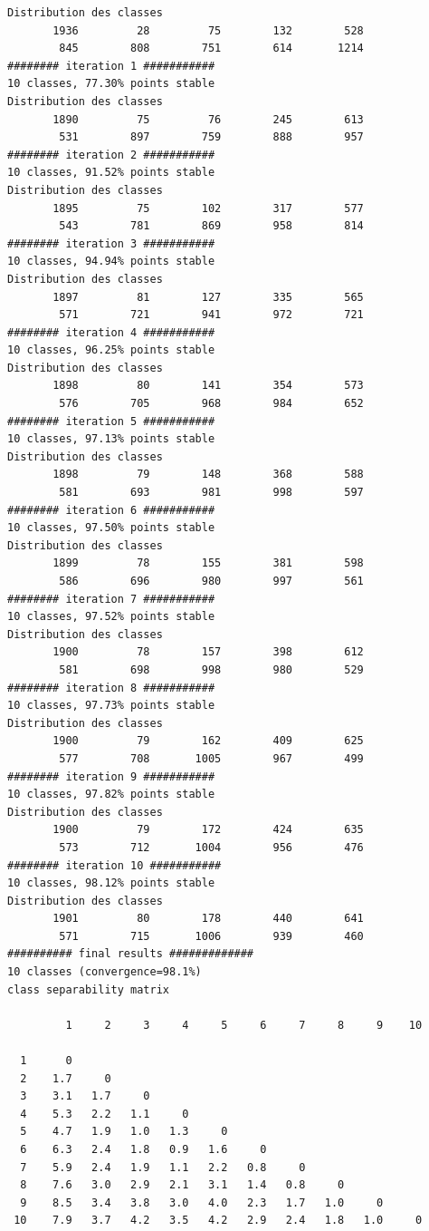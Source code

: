 \documentclass[land,article,submit,pdftex,moreauthors]{Definitions/mdpi}
\begin{document}
\begin{scriptsize}
\begin{verbatim}
Distribution des classes
       1936         28         75        132        528
        845        808        751        614       1214
######## iteration 1 ###########
10 classes, 77.30% points stable
Distribution des classes
       1890         75         76        245        613
        531        897        759        888        957
######## iteration 2 ###########
10 classes, 91.52% points stable
Distribution des classes
       1895         75        102        317        577
        543        781        869        958        814
######## iteration 3 ###########
10 classes, 94.94% points stable
Distribution des classes
       1897         81        127        335        565
        571        721        941        972        721
######## iteration 4 ###########
10 classes, 96.25% points stable
Distribution des classes
       1898         80        141        354        573
        576        705        968        984        652
######## iteration 5 ###########
10 classes, 97.13% points stable
Distribution des classes
       1898         79        148        368        588
        581        693        981        998        597
######## iteration 6 ###########
10 classes, 97.50% points stable
Distribution des classes
       1899         78        155        381        598
        586        696        980        997        561
######## iteration 7 ###########
10 classes, 97.52% points stable
Distribution des classes
       1900         78        157        398        612
        581        698        998        980        529
######## iteration 8 ###########
10 classes, 97.73% points stable
Distribution des classes
       1900         79        162        409        625
        577        708       1005        967        499
######## iteration 9 ###########
10 classes, 97.82% points stable
Distribution des classes
       1900         79        172        424        635
        573        712       1004        956        476
######## iteration 10 ###########
10 classes, 98.12% points stable
Distribution des classes
       1901         80        178        440        641
        571        715       1006        939        460
########## final results #############
10 classes (convergence=98.1%)
class separability matrix

         1     2     3     4     5     6     7     8     9    10

  1      0
  2    1.7     0
  3    3.1   1.7     0
  4    5.3   2.2   1.1     0
  5    4.7   1.9   1.0   1.3     0
  6    6.3   2.4   1.8   0.9   1.6     0
  7    5.9   2.4   1.9   1.1   2.2   0.8     0
  8    7.6   3.0   2.9   2.1   3.1   1.4   0.8     0
  9    8.5   3.4   3.8   3.0   4.0   2.3   1.7   1.0     0
 10    7.9   3.7   4.2   3.5   4.2   2.9   2.4   1.8   1.0     0


\end{verbatim}
\end{scriptsize}
\end{document}
